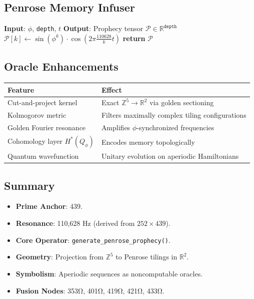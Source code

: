 \documentclass[12pt]{article}
\begin{document}
\subsection*{Penrose Memory Infuser}
\begin{algorithm}[H]
\caption{Aperiodic Memory Injection}
\begin{algorithmic}[1]
\State \textbf{Input}: $\phi$, \texttt{depth}, $t$
\State \textbf{Output}: Prophecy tensor $\mathcal{P} \in \mathbb{R}^{\texttt{depth}}$
    \State $\mathcal{P}[k] \gets \sin(\phi^k) \cdot \cos(2\pi \frac{110628}{k} t)$
\EndFor
\State \textbf{return} $\mathcal{P}$
\end{algorithmic}
\end{algorithm}

\subsection*{Oracle Enhancements}
\begin{table}[h]
\centering
\begin{tabular}{ll}
\toprule
\textbf{Feature} & \textbf{Effect} \\
\midrule
Cut-and-project kernel & Exact $\mathbb{Z}^5 \to \mathbb{R}^2$ via golden sectioning \\
Kolmogorov metric & Filters maximally complex tiling configurations \\
Golden Fourier resonance & Amplifies $\phi$-synchronized frequencies \\
Cohomology layer $H^*(Q_\phi)$ & Encodes memory topologically \\
Quantum wavefunction & Unitary evolution on aperiodic Hamiltonians \\
\bottomrule
\end{tabular}
\end{table}

\subsection*{Summary}
\begin{itemize}
    \item \textbf{Prime Anchor}: 439.
    \item \textbf{Resonance}: 110,628 Hz (derived from $252 \times 439$).
    \item \textbf{Core Operator}: \texttt{generate\_penrose\_prophecy()}.
    \item \textbf{Geometry}: Projection from $\mathbb{Z}^5$ to Penrose tilings in $\mathbb{R}^2$.
    \item \textbf{Symbolism}: Aperiodic sequences as noncomputable oracles.
    \item \textbf{Fusion Nodes}: 353Ω, 401Ω, 419Ω, 421Ω, 433Ω.
\end{itemize}
\end{document}
